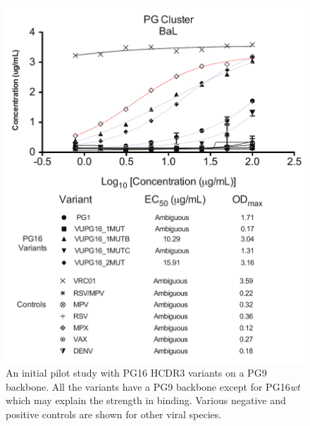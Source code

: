 \begin{figure}[!t]
   \centering
   \includegraphics[width=.9\textwidth]{images/chapter5/figure5_4.pdf}
   \caption[Binding Profile of PG16 Variants]{An initial pilot study with PG16 HCDR3 variants on a PG9 backbone. All the variants have a PG9 backbone except for PG16\textit{wt} which may explain the strength in binding. Various negative and positive controls are shown for other viral species.}
    \label{fig:fig5_4}
\end{figure}




